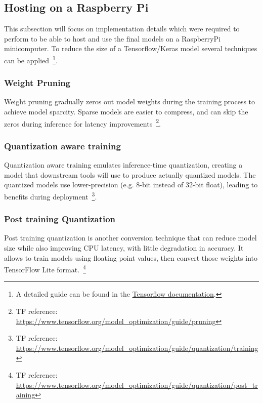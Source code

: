 \subsection{Hosting on a Raspberry Pi}\label{subsec:hosting-on-raspberry}
This subsection will focus on implementation details which were required to perform to be able to host and use the final models on a RaspberryPi minicomputer.
To reduce the size of a Tensorflow/Keras model several techniques can be applied~\footnote{
    A detailed guide can be found in the \href{https://www.tensorflow.org/model_optimization/guide/get_started}{Tensorflow documentation}.
}.
\subsubsection{Weight Pruning}\label{subsub:weight-pruning}
Weight pruning gradually zeros out model weights during the training process to achieve model sparcity.
Sparse models are easier to compress, and can skip the zeros during inference for latency improvements~\footnote{TF reference: \url{https://www.tensorflow.org/model_optimization/guide/pruning}}.
\subsubsection{Quantization aware training}\label{subsub:quant-aware-training}
Quantization aware training emulates inference-time quantization, creating a model that downstream tools will use to produce actually quantized models. The quantized models use lower-precision (e.g. 8-bit instead of 32-bit float), leading to benefits during deployment~\footnote{TF reference: \url{https://www.tensorflow.org/model_optimization/guide/quantization/training}}.
\subsubsection{Post training Quantization}\label{subsub:quantization}
Post training quantization is another conversion technique that can reduce model size while also improving CPU latency, with little degradation in accuracy.
It allows to train models using floating point values, then convert those weights into TensorFlow Lite format.~\footnote{TF reference: \url{https://www.tensorflow.org/model_optimization/guide/quantization/post_training}}
